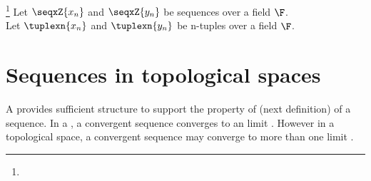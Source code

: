 \begin{definition}
\footnote{
  }
Let $\seqxZ{x_n}$ and $\seqxZ{y_n}$ be sequences over a field $\F$.\\
Let $\tuplexn{x_n}$ and $\tuplexn{y_n}$ be n-tuples over a field $\F$.
\end{definition}

\section{Sequences in topological spaces}
A   provides sufficient structure to support the property 
of  (next definition) of a sequence.
In a , a convergent sequence converges to an  limit .
However in a topological space, a convergent sequence may converge to more than one limit .

